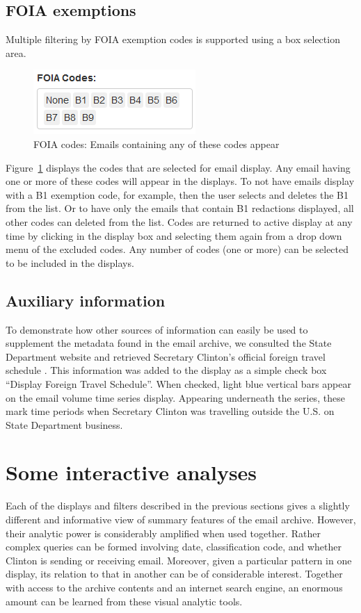 \documentclass[journal]{vgtc}                %
\begin{document}
\subsection{FOIA exemptions}
Multiple filtering by FOIA exemption codes is supported using a box selection area. 
\begin{figure}[h]
\begin{center}
\includegraphics[width=0.55\linewidth]{FOIABoxImage}
\caption{FOIA codes:  Emails containing any of these codes appear}
\label{fig:selectFOIA}
\end{center}
\end{figure}
Figure~\ref{fig:selectFOIA} displays the codes that are selected for email display.  Any email having one or more of these codes will appear in the displays.  To not have emails display with a B1 exemption code, for example, then the user selects and deletes the B1 from the list.  Or to have only the emails that  contain B1 redactions displayed, all other codes can deleted from the list.  Codes are returned to active display at any time by clicking in the display box and selecting them again from a drop down menu of the excluded codes.  Any number of codes  (one or more) can be selected to be included in the displays.

\subsection{Auxiliary information}
To demonstrate how other sources of information can easily be used to supplement the metadata found in the email archive, we consulted the State Department website and retrieved Secretary Clinton's official foreign travel schedule  \cite{ForeignSched}.  This information was added to the display as a simple check box ``Display Foreign Travel Schedule''.  When checked, light blue vertical bars appear on the  email volume time series display.  Appearing underneath the series, these mark time periods when Secretary Clinton was travelling outside the U.S. on State Department business.

\section{Some interactive analyses}
\label{sect:Analysis}
Each of the displays and filters described in the previous sections gives a slightly different and informative view of summary features of the email archive.  However, their analytic power is considerably amplified when used together.  Rather complex queries can be formed involving date, classification code, and whether Clinton is sending or receiving email.  Moreover, given a particular pattern in one display, its relation to that in another can be of considerable interest.   Together with access to the archive contents and an internet search engine, an enormous amount can be learned from these visual analytic tools.
\end{document}
